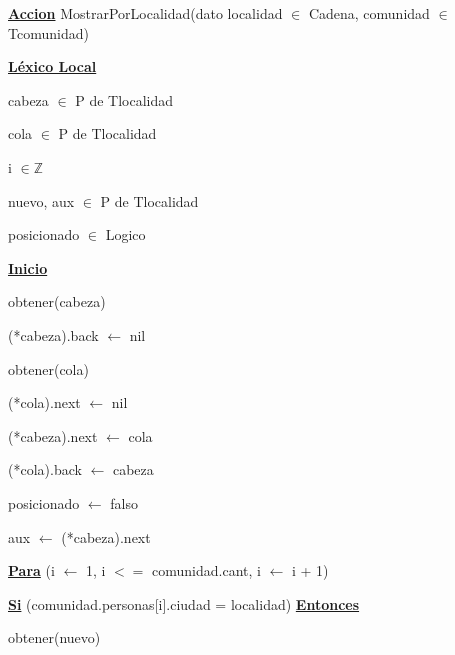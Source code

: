 \documentclass{article}
\begin{document}
    \hspace{4mm}\underline{\textbf{Accion}} MostrarPorLocalidad(dato localidad $\in$ Cadena, comunidad $\in$ Tcomunidad)

        \hspace{8mm}\underline{\textbf{Léxico Local}}

            \hspace{12mm}cabeza $\in$ P de Tlocalidad

            \hspace{12mm}cola $\in$ P de Tlocalidad

            \hspace{12mm}i $\in \mathbb{Z}$

            \hspace{12mm}nuevo, aux $\in$ P de Tlocalidad

            \hspace{12mm}posicionado $\in$ Logico

        \hspace{8mm}\underline{\textbf{Inicio}}

            \hspace{12mm}obtener(cabeza)

            \hspace{12mm}(*cabeza).back $\leftarrow$ nil

            \hspace{12mm}obtener(cola)

            \hspace{12mm}(*cola).next $\leftarrow$ nil

            \hspace{12mm}(*cabeza).next $\leftarrow$ cola

            \hspace{12mm}(*cola).back $\leftarrow$ cabeza

            \hspace{12mm}posicionado $\leftarrow$ falso

            \hspace{12mm}aux $\leftarrow$ (*cabeza).next

            \hspace{12mm}\underline{\textbf{Para}} (i $\leftarrow$ 1, i $<=$ comunidad.cant, i $\leftarrow$ i + 1)

            \hspace{16mm}\underline{\textbf{Si}} (comunidad.personas[i].ciudad = localidad) \underline{\textbf{Entonces}}

                \hspace{20mm}obtener(nuevo)
\end{document}
